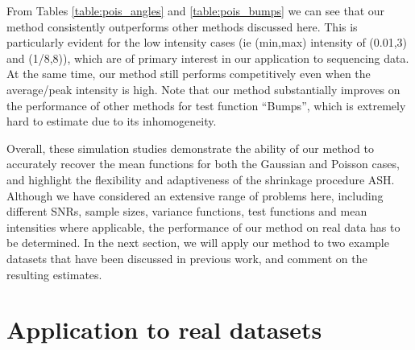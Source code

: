 \documentclass[12pt]{article}
\begin{document}
From Tables \ref{table:pois_angles} and \ref{table:pois_bumps} we can see that our method consistently outperforms other methods discussed here. This is particularly evident for the low intensity cases (ie (min,max) intensity of (0.01,3) and (1/8,8)), which are of primary interest in our application to sequencing data. At the same time, our method still performs competitively even when the average/peak intensity is high. Note that our method substantially improves on the performance of other methods for test function ``Bumps'', which is extremely hard to estimate due to its inhomogeneity.

Overall, these simulation studies demonstrate the ability of our method to accurately recover the mean functions for both the Gaussian and Poisson cases, and highlight the flexibility and adaptiveness of the shrinkage procedure ASH. Although we have considered an extensive range of problems here, including different SNRs, sample sizes, variance functions, test functions and mean intensities where applicable, the performance of our method on real data has to be determined. In the next section, we will apply our method to two example datasets that have been discussed in previous work, and comment on the resulting estimates.
\bigskip\\
\section{Application to real datasets}
\end{document}
